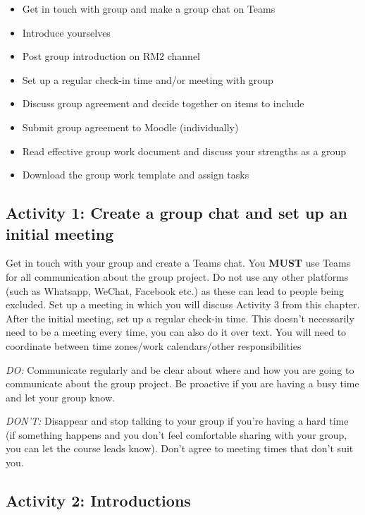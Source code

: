 \documentclass[
  english,
  letterpaper,
  DIV=11,
  numbers=noendperiod]{scrreprt}
\providecommand{\tightlist}{%
  \setlength{\itemsep}{0pt}\setlength{\parskip}{0pt}}
\begin{document}
\begin{itemize}
\tightlist
\item
  Get in touch with group and make a group chat on Teams
\item
  Introduce yourselves
\item
  Post group introduction on RM2 channel
\item
  Set up a regular check-in time and/or meeting with group
\item
  Discuss group agreement and decide together on items to include
\item
  Submit group agreement to Moodle (individually)
\item
  Read effective group work document and discuss your strengths as a
  group
\item
  Download the group work template and assign tasks
\end{itemize}

\subsection{Activity 1: Create a group chat and set up an initial
meeting}\label{activity-1-create-a-group-chat-and-set-up-an-initial-meeting}

Get in touch with your group and create a Teams chat. You \textbf{MUST}
use Teams for all communication about the group project. Do not use any
other platforms (such as Whatsapp, WeChat, Facebook etc.) as these can
lead to people being excluded. Set up a meeting in which you will
discuss Activity 3 from this chapter. After the initial meeting, set up
a regular check-in time. This doesn't necessarily need to be a meeting
every time, you can also do it over text. You will need to coordinate
between time zones/work calendars/other responsibilities

\emph{DO:} Communicate regularly and be clear about where and how you
are going to communicate about the group project. Be proactive if you
are having a busy time and let your group know.

\emph{DON'T:} Disappear and stop talking to your group if you're having
a hard time (if something happens and you don't feel comfortable sharing
with your group, you can let the course leads know). Don't agree to
meeting times that don't suit you.

\subsection{Activity 2: Introductions}\label{activity-2-introductions}
\end{document}
